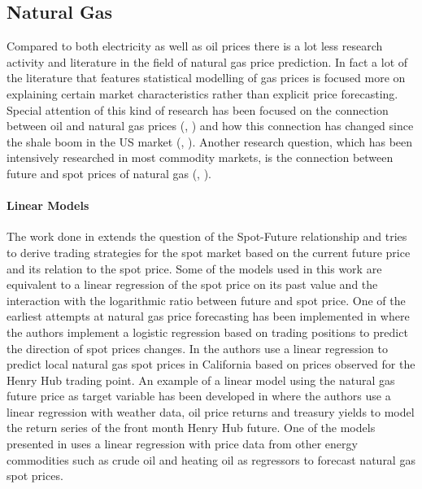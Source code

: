 \subsection{Natural Gas}
Compared to both electricity as well as oil prices there is a lot less research activity and literature in the field of natural gas price prediction. In fact a lot of the literature that features statistical modelling of gas prices is focused more on explaining certain market characteristics rather than explicit price forecasting. Special attention of this kind of research has been focused on the connection between oil and natural gas prices (\cite{villar_relationship_2006}, \cite{hartley_relationship_2008}) and how this connection has changed since the shale boom in the US market (\cite{geng_how_2016}, \cite{caporin_long-run_2017}). Another research question, which has been intensively researched in most commodity markets, is the connection between future and spot prices of natural gas (\cite{herbert_relation_1993}, \cite{chinn_predictive_2014}).

\paragraph{Linear Models}
The work done in \cite{mishra_are_2016} extends the question of the Spot-Future relationship and tries to derive trading strategies for the spot market based on the current future price and its relation to the spot price. Some of the models used in this work are equivalent to a linear regression of the spot price on its past value and the interaction with the logarithmic ratio between future and spot price. One of the earliest attempts at natural gas price forecasting has been implemented in 
\cite{buchanan_which_2001} where the authors implement a logistic regression based on trading positions to predict the direction of spot prices changes.
In \cite{woo_market_2006} the authors use a linear regression to predict local natural gas spot prices in California based on prices observed for the Henry Hub trading point. An example of a linear model using the natural gas future price as target variable has been developed in \cite{mu_weather_2007} where the authors use a linear regression with weather data, oil price returns and treasury yields to model the return series of the front month Henry Hub future. One of the models presented in \cite{malliaris_forecasting_2008} uses a linear regression with price data from other energy commodities such as crude oil and heating oil as regressors to forecast natural gas spot prices. 

